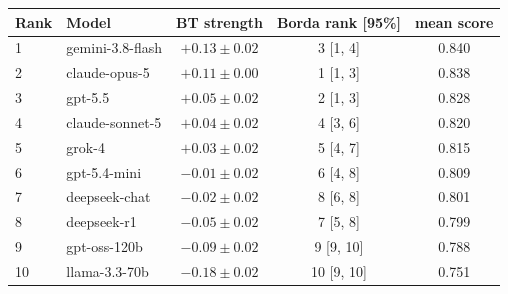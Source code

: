 \begin{tabular}{llccc}
\toprule
Rank & Model & BT strength & Borda rank [95\%] & mean score \\
\midrule
1 & gemini-3.8-flash & $+0.13 \pm 0.02$ & 3 [1, 4] & 0.840 \\
2 & claude-opus-5 & $+0.11 \pm 0.00$ & 1 [1, 3] & 0.838 \\
3 & gpt-5.5 & $+0.05 \pm 0.02$ & 2 [1, 3] & 0.828 \\
4 & claude-sonnet-5 & $+0.04 \pm 0.02$ & 4 [3, 6] & 0.820 \\
5 & grok-4 & $+0.03 \pm 0.02$ & 5 [4, 7] & 0.815 \\
6 & gpt-5.4-mini & $-0.01 \pm 0.02$ & 6 [4, 8] & 0.809 \\
7 & deepseek-chat & $-0.02 \pm 0.02$ & 8 [6, 8] & 0.801 \\
8 & deepseek-r1 & $-0.05 \pm 0.02$ & 7 [5, 8] & 0.799 \\
9 & gpt-oss-120b & $-0.09 \pm 0.02$ & 9 [9, 10] & 0.788 \\
10 & llama-3.3-70b & $-0.18 \pm 0.02$ & 10 [9, 10] & 0.751 \\
\bottomrule
\end{tabular}
